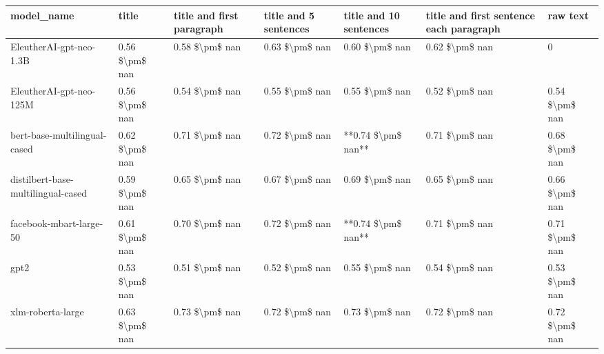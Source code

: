 \begin{tabular}{lllllll}
\toprule
                        model\_name &          title & title and first paragraph & title and 5 sentences & title and 10 sentences & title and first sentence each paragraph &       raw text \\
\midrule
           EleutherAI-gpt-neo-1.3B & 0.56 \$\textbackslash pm\$ nan &            0.58 \$\textbackslash pm\$ nan &        0.63 \$\textbackslash pm\$ nan &         0.60 \$\textbackslash pm\$ nan &                          0.62 \$\textbackslash pm\$ nan &              0 \\
           EleutherAI-gpt-neo-125M & 0.56 \$\textbackslash pm\$ nan &            0.54 \$\textbackslash pm\$ nan &        0.55 \$\textbackslash pm\$ nan &         0.55 \$\textbackslash pm\$ nan &                          0.52 \$\textbackslash pm\$ nan & 0.54 \$\textbackslash pm\$ nan \\
      bert-base-multilingual-cased & 0.62 \$\textbackslash pm\$ nan &            0.71 \$\textbackslash pm\$ nan &        0.72 \$\textbackslash pm\$ nan &     **0.74 \$\textbackslash pm\$ nan** &                          0.71 \$\textbackslash pm\$ nan & 0.68 \$\textbackslash pm\$ nan \\
distilbert-base-multilingual-cased & 0.59 \$\textbackslash pm\$ nan &            0.65 \$\textbackslash pm\$ nan &        0.67 \$\textbackslash pm\$ nan &         0.69 \$\textbackslash pm\$ nan &                          0.65 \$\textbackslash pm\$ nan & 0.66 \$\textbackslash pm\$ nan \\
           facebook-mbart-large-50 & 0.61 \$\textbackslash pm\$ nan &            0.70 \$\textbackslash pm\$ nan &        0.72 \$\textbackslash pm\$ nan &     **0.74 \$\textbackslash pm\$ nan** &                          0.71 \$\textbackslash pm\$ nan & 0.71 \$\textbackslash pm\$ nan \\
                              gpt2 & 0.53 \$\textbackslash pm\$ nan &            0.51 \$\textbackslash pm\$ nan &        0.52 \$\textbackslash pm\$ nan &         0.55 \$\textbackslash pm\$ nan &                          0.54 \$\textbackslash pm\$ nan & 0.53 \$\textbackslash pm\$ nan \\
                 xlm-roberta-large & 0.63 \$\textbackslash pm\$ nan &            0.73 \$\textbackslash pm\$ nan &        0.72 \$\textbackslash pm\$ nan &         0.73 \$\textbackslash pm\$ nan &                          0.72 \$\textbackslash pm\$ nan & 0.72 \$\textbackslash pm\$ nan \\
\bottomrule
\end{tabular}
